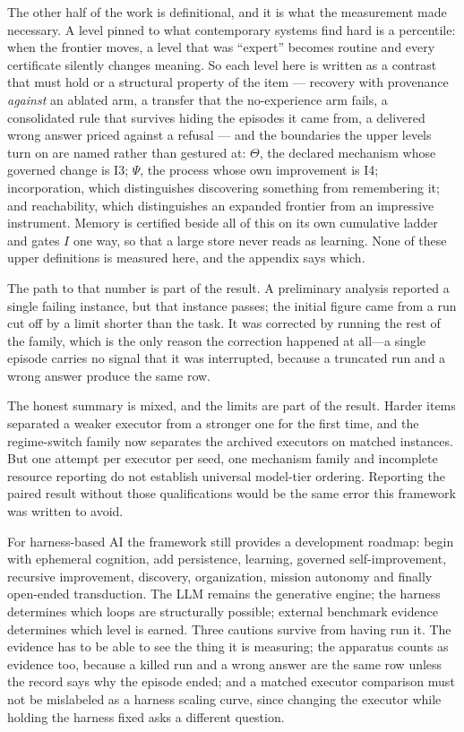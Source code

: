 The other half of the work is definitional, and it is what the measurement made necessary. A level pinned to what contemporary systems find hard is a percentile: when the frontier moves, a level that was ``expert'' becomes routine and every certificate silently changes meaning. So each level here is written as a contrast that must hold or a structural property of the item --- recovery with provenance \emph{against} an ablated arm, a transfer that the no-experience arm fails, a consolidated rule that survives hiding the episodes it came from, a delivered wrong answer priced against a refusal --- and the boundaries the upper levels turn on are named rather than gestured at: $\Theta$, the declared mechanism whose governed change is I3; $\Psi$, the process whose own improvement is I4; incorporation, which distinguishes discovering something from remembering it; and reachability, which distinguishes an expanded frontier from an impressive instrument. Memory is certified beside all of this on its own cumulative ladder and gates $I$ one way, so that a large store never reads as learning. None of these upper definitions is measured here, and the appendix says which.

The path to that number is part of the result. A preliminary analysis reported a single failing instance, but that instance passes; the initial figure came from a run cut off by a limit shorter than the task. It was corrected by running the rest of the family, which is the only reason the correction happened at all---a single episode carries no signal that it was interrupted, because a truncated run and a wrong answer produce the same row.

The honest summary is mixed, and the limits are part of the result. Harder items separated a weaker executor from a stronger one for the first time, and the regime-switch family now separates the archived executors on matched instances. But one attempt per executor per seed, one mechanism family and incomplete resource reporting do not establish universal model-tier ordering. Reporting the paired result without those qualifications would be the same error this framework was written to avoid.

For harness-based AI the framework still provides a development roadmap: begin with ephemeral cognition, add persistence, learning, governed self-improvement, recursive improvement, discovery, organization, mission autonomy and finally open-ended transduction. The LLM remains the generative engine; the harness determines which loops are structurally possible; external benchmark evidence determines which level is earned. Three cautions survive from having run it. The evidence has to be able to see the thing it is measuring; the apparatus counts as evidence too, because a killed run and a wrong answer are the same row unless the record says why the episode ended; and a matched executor comparison must not be mislabeled as a harness scaling curve, since changing the executor while holding the harness fixed asks a different question.


